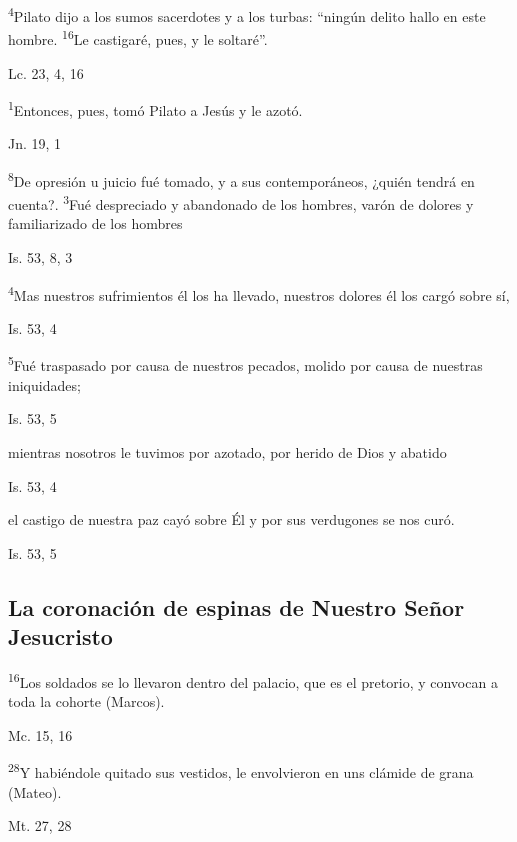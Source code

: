 \documentclass[a4paper,11pt]{article}
\begin{document}
      \textsuperscript{4}Pilato dijo a los sumos sacerdotes y a los turbas: ``ningún delito hallo en este hombre. \textsuperscript{16}Le castigaré, pues, y le soltaré''.
      \begin{flushright}
        Lc. 23, 4, 16
      \end{flushright}

      \textsuperscript{1}Entonces, pues, tomó Pilato a Jesús y le azotó.
      \begin{flushright}
        Jn. 19, 1
      \end{flushright}

      \textsuperscript{8}De opresión u juicio fué tomado, y a sus contemporáneos, ¿quién tendrá en cuenta?. \textsuperscript{3}Fué despreciado y abandonado de los hombres,
      varón de dolores y familiarizado de los hombres
      \begin{flushright}
        Is. 53, 8, 3
      \end{flushright}

      \textsuperscript{4}Mas nuestros sufrimientos él los ha llevado, nuestros dolores él los cargó sobre sí,
      \begin{flushright}
        Is. 53, 4
      \end{flushright}

      \textsuperscript{5}Fué traspasado por causa de nuestros pecados, molido por causa de nuestras iniquidades; 
      \begin{flushright}
        Is. 53, 5
      \end{flushright}

      mientras nosotros le tuvimos por azotado, por herido de Dios y abatido
      \begin{flushright}
        Is. 53, 4 
      \end{flushright}

      el castigo de nuestra paz cayó sobre Él y por sus verdugones se nos curó.
      \begin{flushright}
        Is. 53, 5
      \end{flushright}
      
    \subsection*{\hfil La coronación de espinas de Nuestro Señor Jesucristo \hfil}
      
      \textsuperscript{16}Los soldados se lo llevaron dentro del palacio, que es el pretorio, y convocan a toda la cohorte (Marcos).
      \begin{flushright}
        Mc. 15, 16
      \end{flushright}
      \textsuperscript{28}Y habiéndole quitado sus vestidos, le envolvieron en uns clámide de grana (Mateo).
      \begin{flushright}
        Mt. 27, 28
      \end{flushright}
\end{document}
